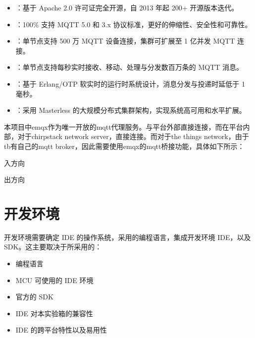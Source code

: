 \documentclass[a4paper,12pt,english]{sphinxmanual}
\begin{document}
\sphinxAtStartPar
{}
\begin{itemize}
\item {} 
\sphinxAtStartPar
{}：基于 Apache 2.0 许可证完全开源，自 2013 年起 200+ 开源版本迭代。

\item {} 
\sphinxAtStartPar
{}：100\% 支持 MQTT 5.0 和 3.x 协议标准，更好的伸缩性、安全性和可靠性。

\item {} 
\sphinxAtStartPar
{}：单节点支持 500 万 MQTT 设备连接，集群可扩展至 1 亿并发 MQTT 连接。

\item {} 
\sphinxAtStartPar
{}：单节点支持每秒实时接收、移动、处理与分发数百万条的 MQTT 消息。

\item {} 
\sphinxAtStartPar
{}：基于 Erlang/OTP 软实时的运行时系统设计，消息分发与投递时延低于 1 毫秒。

\item {} 
\sphinxAtStartPar
{}：采用 Masterless 的大规模分布式集群架构，实现系统高可用和水平扩展。

\end{itemize}

\sphinxAtStartPar
{}

\sphinxAtStartPar
本项目中emqx作为唯一开放的mqtt代理服务。与平台外部直接连接，而在平台内部，对于chirpstack network server，直接连接。而对于the things network，由于tb有自己的mqtt broker，因此需要使用emqx的mqtt桥接功能，具体如下所示：

 入方向

\sphinxAtStartPar
{}

 出方向

\sphinxAtStartPar
{}

\sphinxstepscope


\section{开发环境}
\label{\detokenize{dev-board/ide:id1}}\label{\detokenize{dev-board/ide::doc}}
\sphinxAtStartPar
开发环境需要确定 IDE 的操作系统，采用的编程语言，集成开发环境 IDE，以及 SDK。这主要取决于所采用的：
\begin{itemize}
\item {} 
\sphinxAtStartPar
编程语言

\item {} 
\sphinxAtStartPar
MCU 可使用的 IDE 环境

\item {} 
\sphinxAtStartPar
官方的 SDK

\item {} 
\sphinxAtStartPar
IDE 对本实验箱的兼容性

\item {} 
\sphinxAtStartPar
IDE 的跨平台特性以及易用性

\end{itemize}
\end{document}
